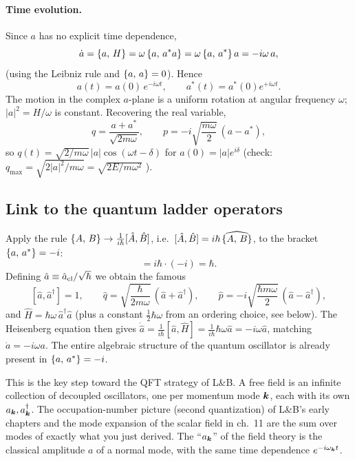 \documentclass[11pt]{article}
\begin{document}
\paragraph{Time evolution.} Since $a$ has no explicit time dependence,
\begin{equation}
 \dot a=\left\{a,\,H\right\}=\omega\left\{a,\,a^*a\right\}=\omega\left\{a,\,a^*\right\}a=-i\omega\,a ,
\end{equation}
(using the Leibniz rule and $\left\{a,\,a\right\}=0$). Hence
\begin{equation}
 a(t)=a(0)\,e^{-i\omega t},\qquad a^*(t)=a^*(0)e^{+i\omega t}.
\end{equation}
The motion in the complex $a$-plane is a uniform rotation at angular frequency $\omega$; $|a|^2=H/\omega$ is constant. Recovering the real variable,
\begin{equation}
 q=\frac{a+a^*}{\sqrt{2m\omega}},\qquad p=-i\sqrt{\frac{m\omega}2}\,(a-a^*),
\label{eq:qpfroma}
\end{equation}
so $q(t)=\sqrt{2/m\omega}\,|a|\cos(\omega t-\delta)$ for $a(0)=|a|e^{i\delta}$ (check: $q_{\max}=\sqrt{2|a|^2/m\omega}=\sqrt{2E/m\omega^2}$ \checkmark).

\subsection{Link to the quantum ladder operators}

Apply the rule $\left\{A,\,B\right\}\to\frac1{i\hbar}[\hat A,\hat B]$, i.e.\ $[\hat A,\hat B]=i\hbar\,\widehat{\left\{A,\,B\right\}}$, to the bracket $\left\{a,\,a^*\right\}=-i$:
\begin{equation}
 [\hat a_{\rm cl},\hat a_{\rm cl}^\dagger]=i\hbar\cdot(-i)=\hbar .
\end{equation}
Defining $\hat a\equiv\hat a_{\rm cl}/\sqrt\hbar$ we obtain the famous
\begin{equation}
 \boxed{[\hat a,\hat a^\dagger]=1},\qquad \hat q=\sqrt{\frac{\hbar}{2m\omega}}\,(\hat a+\hat a^\dagger),\qquad \hat p=-i\sqrt{\frac{\hbar m\omega}2}\,(\hat a-\hat a^\dagger),
\end{equation}
and $\hat H=\hbar\omega\,\hat a^\dagger\hat a$ (plus a constant $\tfrac12\hbar\omega$ from an ordering choice, see below). The Heisenberg equation then gives $\dot{\hat a}=\frac1{i\hbar}[\hat a,\hat H]=\frac1{i\hbar}\hbar\omega\hat a=-i\omega\hat a$, matching $\dot a=-i\omega a$. The entire algebraic structure of the quantum oscillator is already present in $\left\{a,\,a^*\right\}=-i$.

\begin{qftbridge}
This is the key step toward the QFT strategy of L\&B. A free field is an infinite collection of decoupled oscillators, one per momentum mode $\bm{k}$, each with its own $a_{\bm{k}},a_{\bm{k}}^\dagger$. The occupation-number picture (second quantization) of L\&B's early chapters and the mode expansion of the scalar field in ch.~11 are the sum over modes of exactly what you just derived. The ``$a_{\bm{k}}$'' of the field theory is the classical amplitude $a$ of a normal mode, with the same time dependence $e^{-i\omega_{\bm{k}}t}$.
\end{qftbridge}
\end{document}

